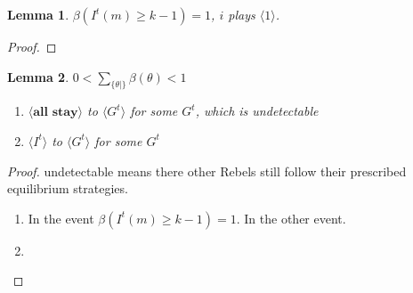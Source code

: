 \documentclass[12pt,letter]{article}
\newtheorem{lemma}{Lemma}[section]
\theoremstyle{definition}
\theoremstyle{remark}
\theoremstyle{claim}
\begin{document}
\begin{lemma}
$\beta(I^t(m)\geq k-1)=1$, $i$ plays $\langle 1 \rangle$.
\end{lemma}
\begin{proof}
\end{proof}

\begin{lemma}
$0<\sum_{\{\theta|\}}\beta(\theta)<1$
\begin{enumerate}
\item $\langle \textbf{all stay} \rangle$ to $\langle G^t \rangle$ for some $G^t$, which is undetectable
\item $\langle I^t \rangle$ to $\langle G^t \rangle$ for some $G^t$
\end{enumerate}
\end{lemma}
\begin{proof}
undetectable means there other Rebels still follow their prescribed equilibrium strategies.
\begin{enumerate}
\item In the event $\beta(I^t(m)\geq k-1)=1$. In the other event.
\item
\end{enumerate}
\end{proof}
\end{document}
